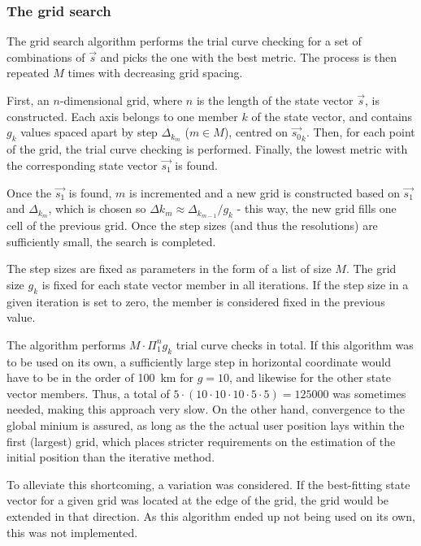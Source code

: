 \subsubsection{The grid search}
The grid search algorithm performs the trial curve checking for a set of combinations of $\Vec{s}$ and picks the one with the best metric. %
The process is then repeated $M$ times with decreasing grid spacing.

First, an $n$-dimensional grid, where $n$ is the length of the state vector $\Vec{s}$, is constructed. Each axis belongs to one member $k$ of the state vector, and contains $g_k$ values spaced apart by step $\Delta_{k_m}$ ($m \in M$), centred on $\Vec{s_0}_k$. Then, for each point of the grid, the trial curve checking is performed. Finally, the lowest metric  with the corresponding state vector $\Vec{s_1}$ is found.

Once the $\Vec{s_1}$ is found, $m$ is incremented and a new grid is constructed based on $\Vec{s_1}$ and $\Delta_{k_m}$, which is chosen so $\Delta{k_{m}} \approx \Delta_{k_{m-1}} / g_k$ - this way, the new grid fills one cell of the previous grid. Once the step sizes (and thus the resolutions) are sufficiently small, the search is completed.

The step sizes are fixed as parameters in the form of a list of size $M$. The grid size $g_k$ is fixed for each state vector member in all iterations. If the step size in a given iteration is set to zero, the member is considered fixed in the previous value.

The algorithm performs $M \cdot \Pi^n_1 g_k$ trial curve checks in total. If this algorithm was to be used on its own, a sufficiently large step in horizontal coordinate would have to be in the order of \qty{100}{km} for $g = 10$, and likewise for the other state vector members. Thus, a total of $5 \cdot (10 \cdot 10 \cdot 10 \cdot 5 \cdot 5) = \num{125000}$ was sometimes needed, making this approach very slow. On the other hand, convergence to the global minium is assured, as long as the the actual user position lays within the first (largest) grid, which places stricter requirements on the estimation of the initial position than the iterative method.

To alleviate this shortcoming, a variation was considered. If the best-fitting state vector for a given grid was located at the edge of the grid, the grid would be extended in that direction. As this algorithm ended up not being used on its own, this was not implemented.

